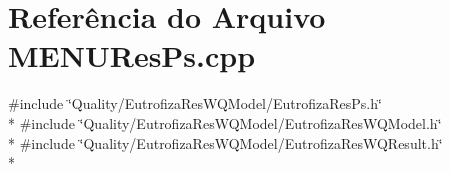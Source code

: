 \section{Referência do Arquivo M\+E\+N\+U\+Res\+Ps.\+cpp}
\label{_m_e_n_u_res_ps_8cpp}
{\ttfamily \#include \char`\"{}Quality/\+Eutrofiza\+Res\+W\+Q\+Model/\+Eutrofiza\+Res\+Ps.\+h\char`\"{}}\\*
{\ttfamily \#include \char`\"{}Quality/\+Eutrofiza\+Res\+W\+Q\+Model/\+Eutrofiza\+Res\+W\+Q\+Model.\+h\char`\"{}}\\*
{\ttfamily \#include \char`\"{}Quality/\+Eutrofiza\+Res\+W\+Q\+Model/\+Eutrofiza\+Res\+W\+Q\+Result.\+h\char`\"{}}\\*
